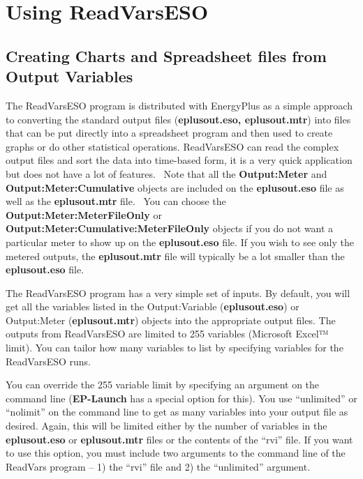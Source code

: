 \section{Using ReadVarsESO}\label{using-readvarseso}

\subsection{Creating Charts and Spreadsheet files from Output Variables}\label{creating-charts-and-spreadsheet-files-from-output-variables}

The ReadVarsESO program is distributed with EnergyPlus as a simple approach to converting the standard output files (\textbf{eplusout.eso, eplusout.mtr}) into files that can be put directly into a spreadsheet program and then used to create graphs or do other statistical operations. ReadVarsESO can read the complex output files and sort the data into time-based form, it is a very quick application but does not have a lot of features.~ Note that all the \textbf{Output:Meter} and \textbf{Output:Meter:Cumulative} objects are included on the \textbf{eplusout.eso} file as well as the \textbf{eplusout.mtr} file.~ You can choose the \textbf{Output:Meter:MeterFileOnly} or \textbf{Output:Meter:Cumulative:MeterFileOnly} objects if you do not want a particular meter to show up on the \textbf{eplusout.eso} file. If you wish to see only the metered outputs, the \textbf{eplusout.mtr} file will typically be a lot smaller than the \textbf{eplusout.eso} file.

The ReadVarsESO program has a very simple set of inputs. By default, you will get all the variables listed in the Output:Variable (\textbf{eplusout.eso}) or Output:Meter (\textbf{eplusout.mtr}) objects into the appropriate output files. The outputs from ReadVarsESO are limited to 255 variables (Microsoft Excel™ limit). You can tailor how many variables to list by specifying variables for the ReadVarsESO runs.

You can override the 255 variable limit by specifying an argument on the command line (\textbf{EP-Launch} has a special option for this). You use ``unlimited'' or ``nolimit'' on the command line to get as many variables into your output file as desired. Again, this will be limited either by the number of variables in the \textbf{eplusout.eso} or \textbf{eplusout.mtr} files or the contents of the ``rvi'' file. If you want to use this option, you must include two arguments to the command line of the ReadVars program -- 1) the ``rvi'' file and 2) the ``unlimited'' argument.

